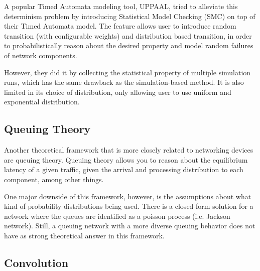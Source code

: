 A popular Timed Automata modeling tool, UPPAAL, tried to alleviate this determinism problem by 
introducing Statistical Model Checking (SMC) on top of their Timed Automata model. 
The feature allows user to introduce random transition (with configurable weights) and distribution 
based transition, in order to probabilistically reason about the desired property and model 
random failures of network components.

However, they did it by collecting the statistical property of multiple simulation runs, which 
has the same drawback as the simulation-based method. 
It is also limited in its choice of distribution, only allowing user to use uniform and 
exponential distribution.

\subsection{Queuing Theory}
Another theoretical framework that is more closely related to networking devices are queuing 
theory.
Queuing theory allows you to reason about the equilibrium latency of a given traffic, given the 
arrival and processing distribution to each component, among other things.

One major downside of this framework, however, is the assumptions about what kind of probability 
distributions being used. 
There is a closed-form solution for a network where the queues are identified as a poisson process 
(i.e. Jackson network). 
Still, a queuing network with a more diverse queuing behavior does not have as strong theoretical 
answer in this framework.

\subsection{Convolution}


